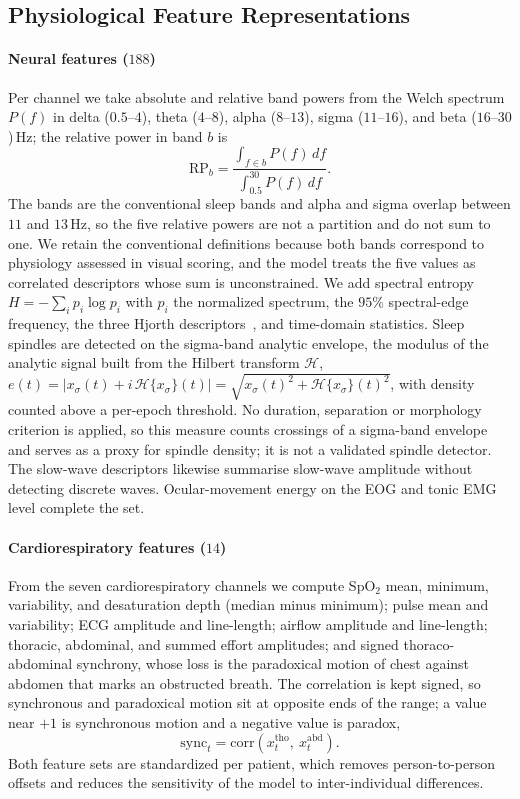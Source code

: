 \documentclass[a4paper,fleqn]{cas-sc}
\begin{document}
\subsection{Physiological Feature Representations}
\label{sec:features}
\paragraph{Neural features ($188$)}
Per channel we take absolute and relative band powers from the Welch spectrum $P(f)$ in delta
($0.5$--$4$), theta ($4$--$8$), alpha ($8$--$13$), sigma ($11$--$16$), and beta
($16$--$30$)\,Hz; the relative power in band $b$ is
\begin{equation}
\mathrm{RP}_b=\frac{\int_{f\in b}P(f)\,df}{\int_{0.5}^{30}P(f)\,df}.
\end{equation}
The bands are the conventional sleep bands and alpha and sigma overlap between $11$ and
$13$\,Hz, so the five relative powers are not a partition and do not sum to one. We retain the conventional definitions because both bands correspond to physiology assessed in visual scoring, and the model treats the five values as correlated descriptors whose sum is unconstrained.
We add spectral entropy $H=-\sum_i p_i\log p_i$ with $p_i$ the normalized spectrum, the
$95\%$ spectral-edge frequency, the three Hjorth descriptors~\cite{hjorth1970eeg}, and
time-domain statistics. Sleep spindles are detected on the sigma-band analytic envelope,
the modulus of the analytic signal built from the Hilbert transform $\mathcal{H}$,
$e(t)=\lvert x_\sigma(t)+i\,\mathcal{H}\{x_\sigma\}(t)\rvert=\sqrt{x_\sigma(t)^2+\mathcal{H}\{x_\sigma\}(t)^2}$, with
density counted above a per-epoch threshold. No duration, separation or morphology criterion is applied, so this measure counts crossings of a sigma-band envelope and serves as a proxy for spindle density; it is not a validated spindle detector. The slow-wave descriptors likewise summarise slow-wave amplitude without detecting discrete waves. Ocular-movement energy on
the EOG and tonic EMG level complete the set.

\paragraph{Cardiorespiratory features ($14$)}
From the seven cardiorespiratory channels we compute SpO$_2$ mean, minimum, variability, and
desaturation depth (median minus minimum); pulse mean and variability; ECG amplitude and
line-length; airflow amplitude and line-length; thoracic, abdominal, and summed effort
amplitudes; and signed thoraco-abdominal synchrony, whose loss is the paradoxical motion of
chest against abdomen that marks an obstructed breath. The correlation is kept signed, so
synchronous and paradoxical motion sit at opposite ends of the range; a value near $+1$ is synchronous motion and a negative value is paradox,
\begin{equation}
\mathrm{sync}_t=\mathrm{corr}(x^{\mathrm{tho}}_t,\ x^{\mathrm{abd}}_t).
\end{equation}
Both feature sets are standardized per patient, which removes person-to-person offsets and reduces the sensitivity of the model to inter-individual differences.
\end{document}
